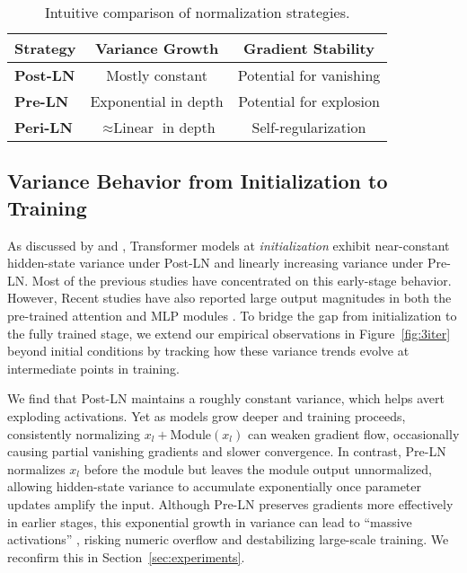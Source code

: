 \begin{table}
\caption{Intuitive comparison of normalization strategies.}
\label{tab:variance_summary}
\small
\begin{tabular}{lcc}
\toprule
\textbf{Strategy} & \textbf{Variance Growth} & \textbf{Gradient Stability} \\
\midrule
\textbf{Post-LN} & Mostly constant & Potential for vanishing \\
\textbf{Pre-LN} & Exponential in depth & Potential for explosion \\
\textbf{Peri-LN} & $ \approx \text{Linear}$ in depth & Self-regularization \\
\bottomrule
\end{tabular}
\vskip -0.1in
\end{table} 



\subsection{Variance Behavior from Initialization to Training}
\label{subsec:variance_growth}


As discussed by \citet{onlayer} and \citet{transformersgetstable}, Transformer models at \emph{initialization} exhibit near-constant hidden-state variance under Post-LN and linearly increasing variance under Pre-LN. Most of the previous studies have concentrated on this early-stage behavior. However, Recent studies have also reported large output magnitudes in both the pre-trained attention and MLP modules \citep{vit22b, smallproxies, mlpswiglu}. To bridge the gap from initialization to the fully trained stage, we extend our empirical observations in Figure~\ref{fig:3iter} beyond initial conditions by tracking how these variance trends evolve at intermediate points in training. 

We find that Post-LN maintains a roughly constant variance, which helps avert exploding activations. Yet as models grow deeper and training proceeds, consistently normalizing $x_l + \mathrm{Module}(x_l)$ can weaken gradient flow, occasionally causing partial vanishing gradients and slower convergence. In contrast, Pre-LN normalizes $x_l$ before the module but leaves the module output unnormalized, allowing hidden-state variance to accumulate exponentially once parameter updates amplify the input. Although Pre-LN preserves gradients more effectively in earlier stages, this exponential growth in variance can lead to “massive activations” \citep{massiveactivation}, risking numeric overflow and destabilizing large-scale training. We reconfirm this in Section~\ref{sec:experiments}.

